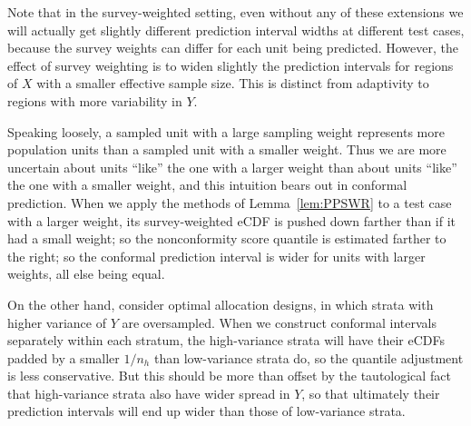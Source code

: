 \documentclass[10.5pt, letterpaper]{article}
\numberwithin{table}{section}
\numberwithin{figure}{section}
\numberwithin{equation}{section}
\begin{document}
Note that in the survey-weighted setting, even without any of these extensions we will actually get slightly different prediction interval widths at different test cases, because the survey weights can differ for each unit being predicted. However, the effect of survey weighting is to widen slightly the prediction intervals for regions of $X$ with a smaller effective sample size. This is distinct from adaptivity to regions with more variability in $Y$.

Speaking loosely, a sampled unit with a large sampling weight represents more population units than a sampled unit with a smaller weight. Thus we are more uncertain about units ``like'' the one with a larger weight than about units ``like'' the one with a smaller weight, and this intuition bears out in conformal prediction. When we apply the methods of Lemma~\ref{lem:PPSWR} to a test case with a larger weight, its survey-weighted eCDF is pushed down farther than if it had a small weight; so the nonconformity score quantile is estimated farther to the right; so the conformal prediction interval is wider for units with larger weights, all else being equal.

On the other hand, consider optimal allocation designs, in which strata with higher variance of $Y$ are oversampled. When we construct conformal intervals separately within each stratum, the high-variance strata will have their eCDFs padded by a smaller $1/n_h$ than low-variance strata do, so the quantile adjustment is less conservative. But this should be more than offset by the tautological fact that high-variance strata also have wider spread in $Y$, so that ultimately their prediction intervals will end up wider than those of low-variance strata.

\end{document}
